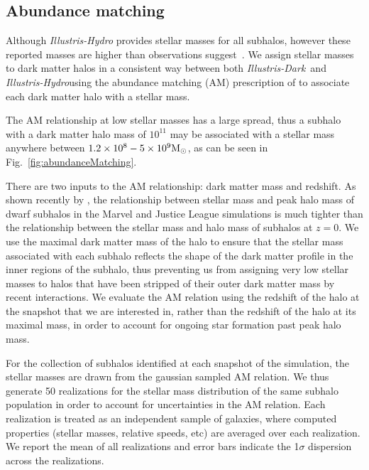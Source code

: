 \documentclass[twocolumn]{aastex63}
\newcommand\msun{\rm{M}_{\odot}}
\newcommand\ID{\textit{Illustris-Dark}}
\newcommand\IH{\textit{Illustris-Hydro}}
\newcommand{\gb}[1]{\textcolor{olive}{\textbf{#1}} }
\begin{document}
\subsection{Abundance matching}\label{sec:abundanceMatching}
Although \textit{Illustris-Hydro} provides stellar masses for all subhalos, however these reported masses are higher than observations suggest~\citep{genel14}. We assign stellar masses to dark matter halos in a consistent way between both \ID\ and \IH using the abundance matching (AM) prescription of \citet{moster13} to associate each dark matter halo with a stellar mass. 

The AM relationship at low stellar masses has a large spread, thus a subhalo with a dark matter halo mass of $10^{11}$ may be associated with a stellar mass anywhere between $1.2\times10^{8} - 5\times10^{9}\rm M_\odot$, as can be seen in Fig.~\ref{fig:abundanceMatching}.

There are two inputs to the AM relationship: dark matter mass and redshift. As shown recently by \citet{munshi21}, the relationship between stellar mass and peak halo mass of dwarf subhalos in the Marvel and Justice League simulations is much tighter than the relationship between the stellar mass and halo mass of subhalos at $z=0$. We use the maximal dark matter mass of the halo to ensure that the stellar mass associated with each subhalo reflects the shape of the dark matter profile in the inner regions of the subhalo, thus preventing us from assigning very low stellar masses to halos that have been stripped of %
their outer dark matter mass by recent interactions. We evaluate the AM relation using the redshift of the halo at the snapshot that we are interested in, rather than the redshift of the halo at its maximal mass, in order to account for ongoing star formation past peak halo mass. 

For the collection of subhalos identified at each snapshot of the simulation, the stellar masses are drawn from the gaussian sampled AM relation. We thus generate 50 realizations for the stellar mass distribution of the same subhalo population in order to account for uncertainties in the AM relation. Each realization is treated as an independent sample of galaxies, where computed properties (stellar masses, relative speeds, etc) are averaged over each realization. We report the mean of all realizations and error bars indicate the 1$\sigma$ dispersion across the realizations.

\end{document}
